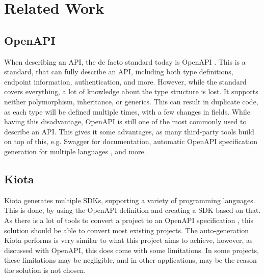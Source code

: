 \section{Related Work}
\subsection*{OpenAPI \label{sec:analysis_openapi}}
When describing an API, the de facto standard today is OpenAPI \cite{open-api}. This is a standard, that can fully describe an API, including both type definitions, endpoint information, authentication, and more. However, while the standard covers everything, a lot of knowledge about the type structure is lost. It supports neither polymorphism, inheritance, or generics. This can result in duplicate code, as each type will be defined multiple times, with a few changes in fields.
While having this disadvantage, OpenAPI is still one of the most commonly used to describe an API. This gives it some advantages, as many third-party tools build on top of this, e.g. Swagger \cite{swagger} for documentation, automatic OpenAPI specification generation for multiple languages \cite{to_open_api_csharp} \cite{to_open_api_java} \cite{to_open_api_typescript}, and more.

\subsection*{Kiota}
Kiota \cite{kiota} generates multiple SDKs, supporting a variety of programming languages. This is done, by using the OpenAPI definition and creating a SDK based on that. As there is a lot of tools to convert a project to an OpenAPI specification \cite{to_open_api_csharp} \cite{to_open_api_java} \cite{to_open_api_typescript}, this solution should be able to convert most existing projects. The auto-generation Kiota performs is very similar to what this project aims to achieve, however, as discussed with OpenAPI, this does come with some limitations. In some projects, these limitations may be negligible, and in other applications, may be the reason the solution is not chosen.


